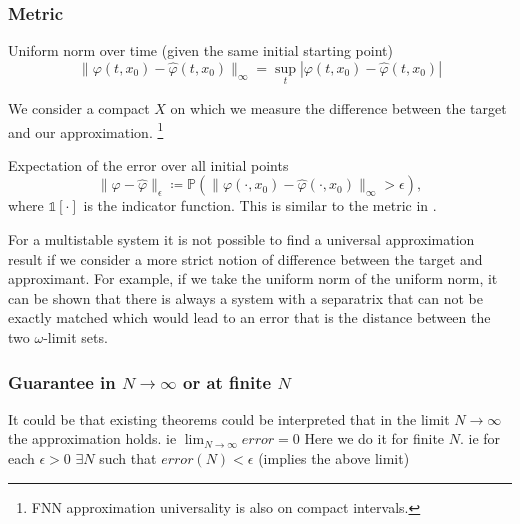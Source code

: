 \documentclass{article}
\theoremstyle{definition}
\theoremstyle{remark}
\newcommand{\vol}{\operatorname{vol}}
\begin{document}
\subsubsection{Metric}

Uniform norm over time (given the same initial starting point)
\begin{equation}
\|\varphi(t,x_0)-\hat \varphi(t,x_0)\|_\infty = \sup_t|\varphi(t,x_0)-\hat \varphi(t,x_0)|
\end{equation}

We consider a compact $X$ on which we measure the difference between the target and our approximation.
\footnote{FNN approximation universality is also on compact intervals.}

Expectation of the error over all initial points
\begin{equation}
\|\varphi-\hat \varphi\|_\epsilon \coloneqq  \mathbb{P}\left(\|\varphi(\cdot,x_0)-\hat \varphi(\cdot,x_0)\|_\infty>\epsilon\right),
\end{equation}
where $\mathds{1}[\cdot]$ is the indicator function. 
This is similar to the metric in \citep{hammer2000approximation}.


For a multistable system it is not possible to find a universal approximation result if we consider a more strict notion of difference between the target and approximant.
For example, if we take the uniform norm of the uniform norm, it can be shown that there is always a system with a separatrix that can not be exactly matched which would lead to an error that is the distance between the two $\omega$-limit sets.

\subsubsection{Guarantee in $N\rightarrow\infty$ or at finite $N$}
It could be that existing theorems could be interpreted that in the limit $N\rightarrow\infty$ the approximation holds. %
ie $\lim_{N\rightarrow\infty} error = 0$
Here we do it for finite $N$.
ie for each $\epsilon>0$ $\exists N$ such that $error(N) < \epsilon$
(implies the above limit)
\end{document}

